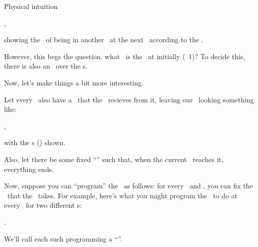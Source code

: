 \begin{part} {Physical intuition}
\begin{itemize}
\begin{center}
,
      \end{center}
  \end{itemize}
  showing the \cprb\ of 
  being in another \til\ at 
  the next \stp\ according to the \trd.

  However, this begs the question, 
  what \til\ is the \agt\ at initially (\stp\ 1)? 
  To decide this, there is also an \ind\ over the \til{}s.

  \newpage
  Now, let's make things a bit more interesting. 

  Let every \til\ also have a \rwd\ that 
  the \agt\ recieves from it, 
  leaving our \brd\ looking something like:

  \begin{center}
    ,
  \end{center}
  with the \rwd{}s 
  () shown.

  Also, let there be some fixed ``\lmt'' such that,
  when the current \stp\ reaches it, everything ends.

  Now, suppose you can ``program'' the \agt\ as follows: 
  for every \til\ and \stp, you can fix the \act\ that the \agt\ takes.
  For example, here's what you might program the \agt\ to do 
  at every \til\ for two different \stp{}s:
  \begin{center}
    \hspace{1cm}
    .
  \end{center}
  We'll call each such programming a ``\str''. 


\end{part}
